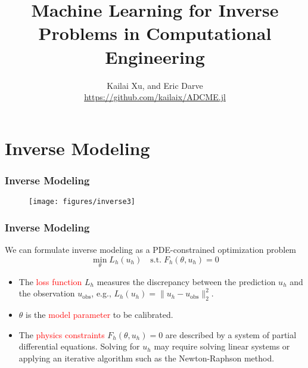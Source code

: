 \documentclass[usenames,dvipsnames]{beamer}
\title[ML for Computational Engineering]{Machine Learning for Inverse Problems in Computational Engineering} %
\author[ADCME]{Kailai Xu, and Eric Darve \\ \url{https://github.com/kailaix/ADCME.jl}} %
\date{}%
\begin{document}
\begin{frame}

\titlepage %

\end{frame}
\usebackgroundtemplate{}

\section{Inverse Modeling}




\begin{frame}
	\frametitle{Inverse Modeling}
	\begin{figure}
	\centering
  \texttt{[image: figures/inverse3]}
\end{figure}
\end{frame}

\begin{frame}
	\frametitle{Inverse Modeling}
	We can formulate inverse modeling as a PDE-constrained optimization problem 
	\begin{equation*}
		\min_{\theta} L_h(u_h) \quad \mathrm{s.t.}\; F_h(\theta, u_h) = 0
	\end{equation*}
	\begin{itemize}
		\item The \textcolor{red}{loss function} $L_h$ measures the discrepancy between the prediction $u_h$ and the observation $u_{\mathrm{obs}}$, e.g., $L_h(u_h) = \|u_h - u_{\mathrm{obs}}\|_2^2$. 
		\item $\theta$ is the \textcolor{red}{model parameter} to be calibrated. 
		\item The \textcolor{red}{physics constraints} $F_h(\theta, u_h)=0$ are described by a system of partial differential equations. Solving for $u_h$ may require solving linear systems or applying an iterative algorithm such as the Newton-Raphson method. 
	\end{itemize}
\end{frame}
\end{document}
